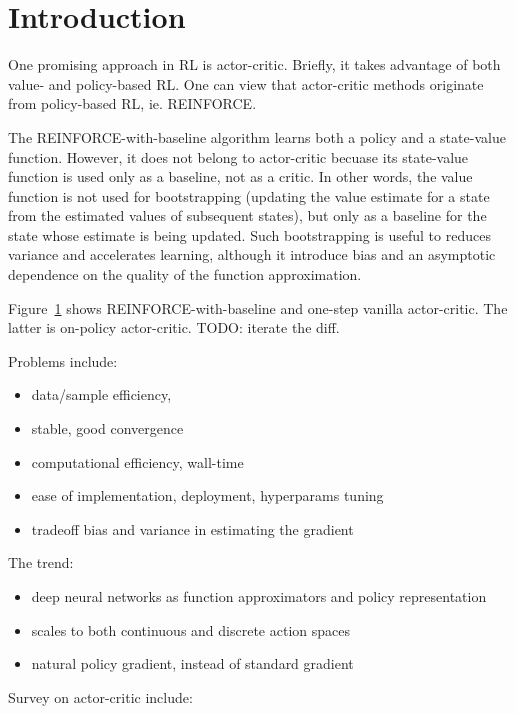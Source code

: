 \section{Introduction}

One promising approach in RL is actor-critic.
Briefly, it takes advantage of both value- and policy-based RL.
One can view that actor-critic methods originate from policy-based RL, ie. REINFORCE.

The REINFORCE-with-baseline algorithm learns both a policy and a state-value function.
However, it does not belong to actor-critic becuase
its state-value function is used only as a baseline, not as a critic.
In other words, the value function is not used for bootstrapping
(updating the value estimate for a state from the estimated values of subsequent states),
but only as a baseline for the state whose estimate is being updated.
Such bootstrapping is useful to reduces variance and accelerates learning,
although it introduce bias and an asymptotic dependence on
the quality of the function approximation.

Figure~\ref{} shows REINFORCE-with-baseline and one-step vanilla actor-critic.
The latter is on-policy actor-critic.
TODO: iterate the diff.

Problems include:
\begin{itemize}
\item data/sample efficiency,
\item stable, good convergence
\item computational efficiency, wall-time
\item ease of implementation, deployment, hyperparams tuning
\item tradeoff bias and variance in estimating the gradient
\end{itemize}

The trend:
\begin{itemize}
\item deep neural networks as
      function approximators and policy representation
\item scales to both continuous and discrete action spaces
\item natural policy gradient, instead of standard gradient
\end{itemize}

Survey on actor-critic include:
\cite{6392457}
